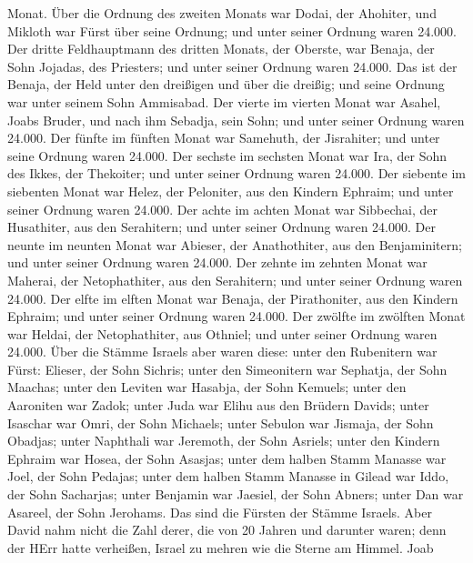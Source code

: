 Monat.  Über die Ordnung des zweiten Monats war Dodai, der
Ahohiter, und Mikloth war Fürst über seine Ordnung; und unter seiner
Ordnung waren 24.000.  Der dritte Feldhauptmann des dritten
Monats, der Oberste, war Benaja, der Sohn Jojadas, des Priesters; und
unter seiner Ordnung waren 24.000.  Das ist der Benaja, der
Held unter den dreißigen und über die dreißig; und seine Ordnung war
unter seinem Sohn Ammisabad.  Der vierte im vierten Monat
war Asahel, Joabs Bruder, und nach ihm Sebadja, sein Sohn; und unter
seiner Ordnung waren 24.000.  Der fünfte im fünften Monat
war Samehuth, der Jisrahiter; und unter seine Ordnung waren 24.000.
 Der sechste im sechsten Monat war Ira, der Sohn des Ikkes,
der Thekoiter; und unter seiner Ordnung waren 24.000.  Der
siebente im siebenten Monat war Helez, der Peloniter, aus den Kindern
Ephraim; und unter seiner Ordnung waren 24.000.  Der achte
im achten Monat war Sibbechai, der Husathiter, aus den Serahitern; und
unter seiner Ordnung waren 24.000.  Der neunte im neunten
Monat war Abieser, der Anathothiter, aus den Benjaminitern; und unter
seiner Ordnung waren 24.000.  Der zehnte im zehnten Monat
war Maherai, der Netophathiter, aus den Serahitern; und unter seiner
Ordnung waren 24.000.  Der elfte im elften Monat war
Benaja, der Pirathoniter, aus den Kindern Ephraim; und unter seiner
Ordnung waren 24.000.  Der zwölfte im zwölften Monat war
Heldai, der Netophathiter, aus Othniel; und unter seiner Ordnung waren
24.000.  Über die Stämme Israels aber waren diese: unter
den Rubenitern war Fürst: Elieser, der Sohn Sichris; unter den
Simeonitern war Sephatja, der Sohn Maachas;  unter den
Leviten war Hasabja, der Sohn Kemuels; unter den Aaroniten war Zadok;
 unter Juda war Elihu aus den Brüdern Davids; unter
Isaschar war Omri, der Sohn Michaels;  unter Sebulon war
Jismaja, der Sohn Obadjas; unter Naphthali war Jeremoth, der Sohn
Asriels;  unter den Kindern Ephraim war Hosea, der Sohn
Asasjas; unter dem halben Stamm Manasse war Joel, der Sohn Pedajas;
 unter dem halben Stamm Manasse in Gilead war Iddo, der
Sohn Sacharjas; unter Benjamin war Jaesiel, der Sohn Abners;
 unter Dan war Asareel, der Sohn Jerohams. Das sind die
Fürsten der Stämme Israels.  Aber David nahm nicht die Zahl
derer, die von 20 Jahren und darunter waren; denn der HErr hatte
verheißen, Israel zu mehren wie die Sterne am Himmel.  Joab
